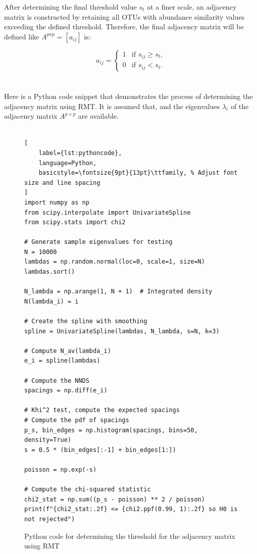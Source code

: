 \noindent After determining the final threshold value $s_t$ at a finer scale, an adjacency matrix is constructed by retaining all OTUs with abundance similarity values exceeding the defined threshold.
Therefore, the final adjacency matrix will be defined like $A^{pxp}=[a_{ij}]$ is:

\[a_{ij} =
\begin{cases}
1 & \text{if } s_{ij} \geq s_t, \\
0 & \text{if } s_{ij} < s_t.
\end{cases}\]
\\\\
\noindent Here is a Python code snippet that demonstrates the process of determining the adjacency matrix using RMT.
It is assumed that, and the eigenvalues $\lambda_i$ of the adjacency matrix $A^{p \times p}$ are available.
\\\\
\begin{figure}[H] %
\centering
\begin{lstlisting}[
    label={lst:pythoncode},
    language=Python,
    basicstyle=\fontsize{9pt}{13pt}\ttfamily, % Adjust font size and line spacing
]
import numpy as np
from scipy.interpolate import UnivariateSpline
from scipy.stats import chi2

# Generate sample eigenvalues for testing
N = 10000
lambdas = np.random.normal(loc=0, scale=1, size=N)
lambdas.sort()

N_lambda = np.arange(1, N + 1)  # Integrated density N(lambda_i) = i

# Create the spline with smoothing
spline = UnivariateSpline(lambdas, N_lambda, s=N, k=3)

# Compute N_av(lambda_i)
e_i = spline(lambdas)

# Compute the NNDS
spacings = np.diff(e_i)

# Khi^2 test, compute the expected spacings
# Compute the pdf of spacings
p_s, bin_edges = np.histogram(spacings, bins=50, density=True)
s = 0.5 * (bin_edges[:-1] + bin_edges[1:])

poisson = np.exp(-s)

# Compute the chi-squared statistic
chi2_stat = np.sum((p_s - poisson) ** 2 / poisson)
print(f"{chi2_stat:.2f} <= {chi2.ppf(0.99, 1):.2f} so H0 is not rejected")
\end{lstlisting}
\caption{Python code for determining the threshold for the adjacency matrix using RMT}
\label{fig:pythoncode}
\end{figure}


